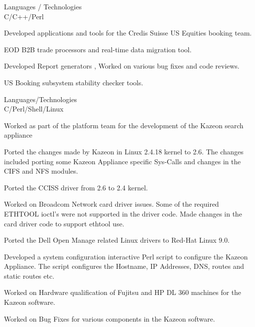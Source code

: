 \documentclass[a4,11pt]{cv4tw}
\begin{document}
{Languages / Technologies \\ C/C++/Perl}
	{ 
	\begin{missions}
		\item Developed applications and tools for the Credis Suisse US Equities booking team.
		\item EOD B2B trade processors and real-time data migration tool.
		\item Developed Report generators , Worked on various bug fixes and code reviews.
		\item US Booking subsystem stability checker tools.
	\end{missions}
}

{Languages/Technologies \\ C/Perl/Shell/Linux}
	{ 
	\begin{missions}		
		\item Worked as part of the platform team for the development of the Kazeon search appliance
		\item Ported the changes made by Kazeon in Linux 2.4.18 kernel to 2.6. The changes included porting some Kazeon Appliance specific Sys-Calls and changes in the CIFS and NFS modules.
		\item Ported the CCISS driver from 2.6 to 2.4 kernel.
		\item Worked on Broadcom Network card driver issues. Some of the required ETHTOOL ioctl's were not supported in the driver code. Made changes in the card driver code to support ethtool use.
		\item Ported the Dell Open Manage related Linux drivers to Red-Hat Linux 9.0.
		\item Developed a  system configuration interactive Perl script to configure the Kazeon Appliance. The script configures the Hostname, IP Addresses, DNS, routes and static routes etc.
		\item Worked on Hardware qualification of Fujitsu and HP DL 360 machines for the Kazeon software.
		\item Worked on Bug Fixes for various components in the Kazeon software.	
	\end{missions}
}
\end{document}
